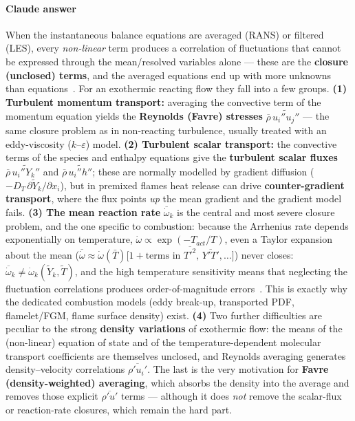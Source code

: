 {\color{istblue}
\paragraph{Claude answer}
When the instantaneous balance equations are averaged (RANS) or filtered (LES), every \emph{non-linear} term produces a correlation of fluctuations that cannot be expressed through the mean/resolved variables alone --- these are the \textbf{closure (unclosed) terms}, and the averaged equations end up with more unknowns than equations~\cite{warnatz2006combustion,veynante2002turbulent,roekaerts2010jmbc}. For an exothermic reacting flow they fall into a few groups. \textbf{(1) Turbulent momentum transport:} averaging the convective term of the momentum equation yields the \textbf{Reynolds (Favre) stresses} $\overline{\rho}\,\widetilde{u_i'' u_j''}$ --- the same closure problem as in non-reacting turbulence, usually treated with an eddy-viscosity ($k$--$\varepsilon$) model. \textbf{(2) Turbulent scalar transport:} the convective terms of the species and enthalpy equations give the \textbf{turbulent scalar fluxes} $\overline{\rho}\,\widetilde{u_i'' Y_k''}$ and $\overline{\rho}\,\widetilde{u_i'' h''}$; these are normally modelled by gradient diffusion ($-D_T\,\partial\tilde Y_k/\partial x_i$), but in premixed flames heat release can drive \textbf{counter-gradient transport}, where the flux points \emph{up} the mean gradient and the gradient model fails. \textbf{(3) The mean reaction rate} $\overline{\dot\omega}_k$ is the central and most severe closure problem, and the one specific to combustion: because the Arrhenius rate depends exponentially on temperature, $\dot\omega \propto \exp(-T_{act}/T)$, even a Taylor expansion about the mean ($\overline{\dot\omega}\approx \dot\omega(\bar T)\big[1 + \text{terms in } \overline{T'^2},\,\overline{Y'T'},\dots\big]$) never closes: $\overline{\dot\omega}_k \neq \dot\omega_k(\tilde Y_k,\tilde T)$, and the high temperature sensitivity means that neglecting the fluctuation correlations produces order-of-magnitude errors~\cite{lecture10}. This is exactly why the dedicated combustion models (eddy break-up, transported PDF, flamelet/FGM, flame surface density) exist. \textbf{(4)} Two further difficulties are peculiar to the strong \textbf{density variations} of exothermic flow: the means of the (non-linear) equation of state and of the temperature-dependent molecular transport coefficients are themselves unclosed, and Reynolds averaging generates density--velocity correlations $\overline{\rho' u_i'}$. The last is the very motivation for \textbf{Favre (density-weighted) averaging}, which absorbs the density into the average and removes those explicit $\overline{\rho' u'}$ terms --- although it does \emph{not} remove the scalar-flux or reaction-rate closures, which remain the hard part.
}


